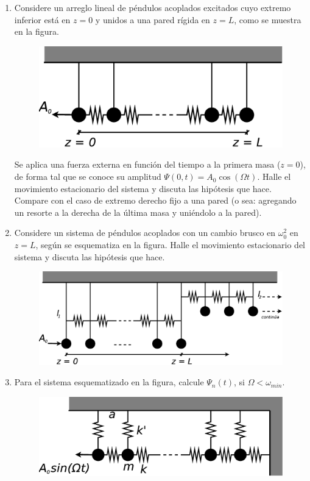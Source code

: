 \documentclass[11pt,spanish,a4paper]{article}
\begin{document}
\begin{enumerate}
\item Considere un arreglo lineal de péndulos acoplados excitados cuyo extremo
inferior está en $z=0$ y unidos a una pared rígida en $z=L$, como
se muestra en la figura.
\begin{figure}[H]
\centering{}\includegraphics[clip,scale=0.25]{ej1-15}
\end{figure}
 Se aplica una fuerza externa en función del tiempo a la primera masa
($z=0$), de forma tal que se conoce su amplitud $\Psi(0,t)=A_{0}\cos(\Omega t)$.
Halle el movimiento estacionario del sistema y discuta las hipótesis
que hace. Compare con el caso de extremo derecho fijo a una pared
(o sea: agregando un resorte a la derecha de la última masa y uniéndolo
a la pared). 
\item Considere un sistema de péndulos acoplados con un cambio brusco en
$\omega_{0}^{2}$ en $z=L$, según se esquematiza en la figura. Halle
el movimiento estacionario del sistema y discuta las hipótesis que
hace.
\begin{figure}[H]
\centering{}\includegraphics[clip,scale=0.25]{ej1-16}
\end{figure}


\item Para el sistema esquematizado en la figura, calcule $\Psi_{n}(t)$,
si $\Omega<\omega_{min}$.
\begin{figure}[H]
\centering{}\includegraphics[clip,scale=0.25]{ej1-17}
\end{figure}




\end{enumerate}
\end{document}
